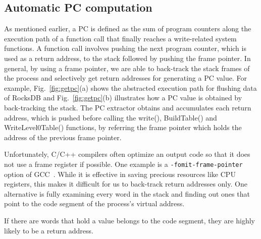 \vspace{-5pt}
\subsection{Automatic PC computation}
As mentioned earlier, a PC is defined as the sum of program counters along the
execution path of a function call that finally reaches a write-related
system functions. A function call involves pushing the next program counter,
which is used as a return address, to the stack
followed by pushing the frame pointer.
In general, by using a frame pointer, 
we are able to back-track the stack frames of the
process and selectively get return addresses for generating a PC value. 
For example, 
Fig.~\ref{fig:getpc}(a) shows the abstracted execution path for flushing data
of RocksDB and
Fig.~\ref{fig:getpc}(b) illustrates how a PC
value is obtained by back-tracking the stack. 
The PC extractor obtains and accumulates each return address, which is pushed 
before calling the {\sf write()}, {\sf BuildTable()} and {\sf WriteLevel0Table()}
functions, by referring the frame pointer which holds the address of the previous 
frame pointer.

Unfortunately, C/C++ compilers often optimize an output code so
that it does not use a frame register if possible.  One example is a
{\tt -fomit-frame-pointer} option of GCC~\cite{GCC}. 
While it is effective in saving
precious resources like CPU registers, this makes it difficult for us to
back-track return addresses only. One alternative is fully examining
every word in the stack and finding out ones that point to the code
segment of the process's virtual address.  

If there are words that hold a value belongs to the code
segment, they are highly likely to be a return address.  


